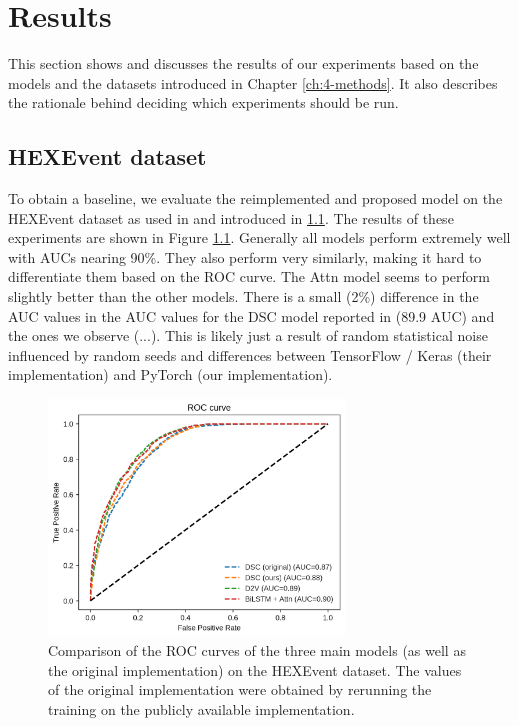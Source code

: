 \chapter{\label{ch:5-results}Results}


This section shows and discusses the results of our experiments based on the models and the datasets introduced in Chapter \ref{ch:4-methods}. It also describes the rationale behind deciding which experiments should be run.

\section{HEXEvent dataset} \label{sec:hexevent} %
To obtain a baseline, we evaluate the reimplemented and proposed model on the HEXEvent dataset as used in \cite{dsc} and introduced in \ref{sec:hexevent}. The results of these experiments are shown in Figure \ref{fig:hexevent_auc}. Generally all models perform extremely well with AUCs nearing 90\%. They also perform very similarly, making it hard to differentiate them based on the ROC curve. The Attn model seems to perform slightly better than the other models. 
There is a small (2\%) difference in the AUC values in the AUC values for the DSC model reported in \cite{dsc} (89.9 AUC) and the ones we observe (...). 
This is likely just a result of random statistical noise influenced by random seeds and differences between TensorFlow / Keras (their implementation) and PyTorch (our implementation).


\begin{figure}
	\centering\includegraphics[width=0.7\textwidth]{../visualizations/hexevent_cross_model_roc_auc_comparison.png} 
	\caption[bla.]{Comparison of the ROC curves of the three main models (as well as the original implementation) on the HEXEvent dataset. The values of the original implementation were obtained by rerunning the training on the publicly available implementation. }
	\label{fig:hexevent_auc}
\end{figure}

